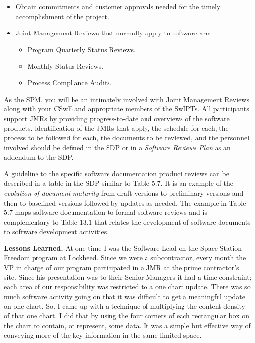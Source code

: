 \begin{itemize}
	\renewcommand{\labelitemi}{\scriptsize$\blacksquare$}
	\item Obtain commitments and customer approvals needed for the timely accomplishment of the project.
	\item Joint Management Reviews that normally apply to	software are:

	\begin{itemize}
		\item Program Quarterly Status Reviews.
		\item Monthly Status Reviews.
		\item Process Compliance Audits.

	\end{itemize}
\end{itemize}


As the SPM, you will be an intimately involved with Joint
Management Reviews along with your CSwE and appropriate members of the SwIPTs. All participants support JMRs
by providing progress-to-date and overviews of the software
products. Identification of the JMRs that apply, the schedule
for each, the process to be followed for each, the documents
to be reviewed, and the personnel involved should be defined
in the SDP or in a \textit{Software Reviews Plan} as an addendum to
the SDP.

A guideline to the specific software documentation product reviews can be described in a table in the SDP similar
to Table 5.7. It is an example of the \textit{evolution of document
maturity} from draft versions to preliminary versions and
then to baselined versions followed by updates as needed.
The example in Table 5.7 maps software documentation to
formal software reviews and is complementary to Table 13.1
that relates the development of software documents to software development activities.


\textbf{Lessons Learned.} At one time I was the Software
Lead on the Space Station Freedom program
at Lockheed. Since we were a subcontractor,
every month the VP in charge of our program
participated in a JMR at the prime contractor’s
site. Since his presentation was to their Senior
Managers it had a time constraint; each area of
our responsibility was restricted to a one chart
update. There was so much software activity
going on that it was difficult to get a meaningful
update on one chart. So, I came up with a technique of multiplying the content density of that
one chart. I did that by using the four corners of
each rectangular box on the chart to contain, or
represent, some data. It was a simple but effective
way of conveying more of the key information in
the same limited space.


